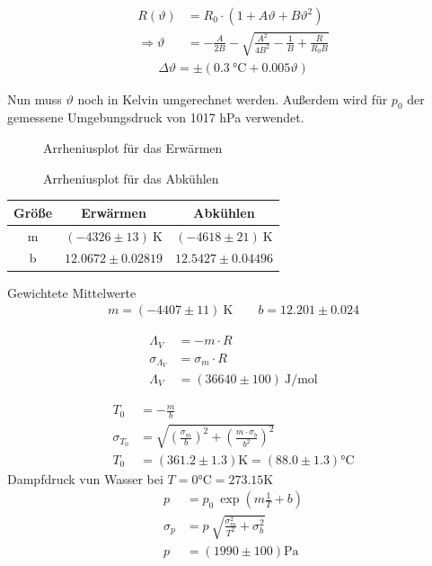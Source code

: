 \documentclass[12pt,a4paper,titlepage,headinclude,bibtotoc]{scrartcl}
\begin{document}
\begin{align}
	R(\vartheta)&=R_0\cdot\left(1 + A\vartheta + B\vartheta^2\right)\\ \Rightarrow
	\vartheta&=-\frac{A}{2B}-\sqrt{\frac{A^2}{4B^2}-\frac{1}{B}+\frac{R}{R_0 B}}
\end{align}
\begin{align}
	\Delta\vartheta=\pm (0.3~\si{\celsius}+0.005\vartheta)
\end{align}

Nun muss $\vartheta$ noch in Kelvin umgerechnet werden.
Außerdem wird für $p_0$ der gemessene Umgebungsdruck von 1017 hPa verwendet.

\begin{figure}[!htb]
	\centering
	
	\caption{Arrheniusplot für das Erwärmen}
	\label{fig:mess1}
\end{figure}

\begin{figure}[!htb]
	\centering
	
	\caption{Arrheniusplot für das Abkühlen}
	\label{fig:mess2}
\end{figure}

\begin{table}[!htb]
 \centering
 \begin{tabular}{|c|c|c|}
  \hline
  Größe&Erwärmen&Abkühlen\\
  \hline
  m & $(-4326 \pm 13)~\si{\kelvin}$ & $(-4618 \pm 21)~\si{\kelvin}$ \\
  b & $12.0672  \pm 0.02819$ & $12.5427 \pm 0.04496$ \\
  \hline
 \end{tabular}
 \label{tab:regErg}
\end{table}

Gewichtete Mittelwerte
\begin{align*}
 m=(-4407 \pm 11)~\si{\kelvin} \qquad
 b=12.201 \pm 0.024
\end{align*}

\begin{align*}
 \Lambda_V &= -m\cdot R\\
 \sigma_{\Lambda_V} &= \sigma_m \cdot R\\
 \Lambda_V&=(36640 \pm 100)~\si{\joule/\mol}
\end{align*}

\begin{align*}
 T_0 &= -\frac{m}{b}\\
 \sigma_{T_0} &= \sqrt{\left(\frac{\sigma_m}{b}\right)^2+\left(\frac{m\cdot \sigma_b}{b^2}\right)^2}\\
 T_0 &= (361.2 \pm 1.3)\si{\kelvin} = (88.0 \pm 1.3)\si{\celsius}
\end{align*}
Dampfdruck vun Wasser bei $T=0\si{\celsius}=273.15\si{\kelvin}$
\begin{align*}
 p &= p_0~\exp\left(m\frac{1}{T}+b\right)\\
 \sigma_p &= p~\sqrt{\frac{\sigma_m^2}{T^2}+\sigma_b^2}\\
 p &= (1990 \pm 100)\si{\pascal}
\end{align*}
\end{document}
